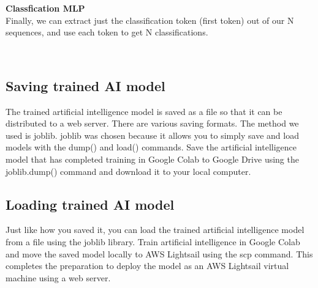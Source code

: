 \textbf{Classfication MLP} \\
Finally, we can extract just the classification token (first token) out of our N sequences, and use each token to get N classifications.



\\
\subsection{\textbf{Saving trained AI model}}
The trained artificial intelligence model is saved as a file so that it can be distributed to a web server. There are various saving formats. The method we used is joblib. joblib was chosen because it allows you to simply save and load models with the dump() and load() commands. Save the artificial intelligence model that has completed training in Google Colab to Google Drive using the joblib.dump() command and download it to your local computer.\\

\subsection{\textbf{Loading trained AI model}}
Just like how you saved it, you can load the trained artificial intelligence model from a file using the joblib library. Train artificial intelligence in Google Colab and move the saved model locally to AWS Lightsail using the scp command. This completes the preparation to deploy the model as an AWS Lightsail virtual machine using a web server.\\

